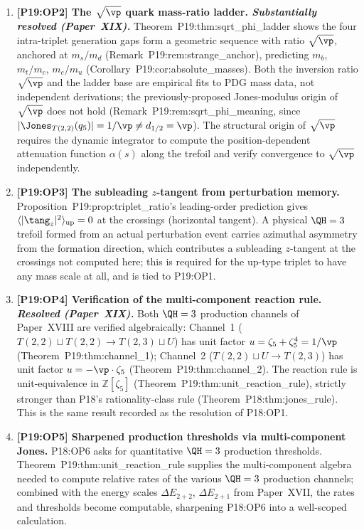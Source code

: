 \begin{enumerate}[label=,leftmargin=*]
\item \textbf{[P19:OP2] The $\sqrt\vp$ quark mass-ratio ladder. \emph{Substantially resolved (Paper~XIX).}}
Theorem~P19:thm:sqrt\_phi\_ladder shows the four intra-triplet
generation gaps form a geometric sequence with ratio $\sqrt\vp$,
anchored at $m_s/m_d$ (Remark~P19:rem:strange\_anchor), predicting
$m_b$, $m_t/m_c$, $m_c/m_u$ (Corollary~P19:cor:absolute\_masses). Both
the inversion ratio $\sqrt\vp$ and the ladder base are empirical fits
to PDG mass data, not independent derivations; the previously-proposed
Jones-modulus origin of $\sqrt\vp$ does not hold
(Remark~P19:rem:sqrt\_phi\_meaning, since
$|\Jones_{T(2,2)}(q_5)|=1/\vp\neq d_{1/2}=\vp$). The structural origin
of $\sqrt\vp$ requires the dynamic integrator to compute the
position-dependent attenuation function $\alpha(s)$ along the trefoil
and verify convergence to $\sqrt\vp$ independently.

\item \textbf{[P19:OP3] The subleading $z$-tangent from perturbation memory.}
Proposition~P19:prop:triplet\_ratio's leading-order prediction gives
$\langle|\tang_z|^2\rangle_{\mathrm{up}}=0$ at the crossings (horizontal
tangent). A physical $\QH=3$ trefoil formed from an actual perturbation
event carries azimuthal asymmetry from the formation direction, which
contributes a subleading $z$-tangent at the crossings not computed
here; this is required for the up-type triplet to have any mass scale
at all, and is tied to P19:OP1.

\item \textbf{[P19:OP4] Verification of the multi-component reaction rule. \emph{Resolved (Paper~XIX).}}
Both $\QH=3$ production channels of Paper~XVIII are verified
algebraically: Channel~1 ($T(2,2)\sqcup T(2,2)\to T(2,3)\sqcup U$) has
unit factor $u=\zeta_5+\zeta_5^4=1/\vp$ (Theorem~P19:thm:channel\_1); Channel~2
($T(2,2)\sqcup U\to T(2,3)$) has unit factor $u=-\vp\cdot\zeta_5$
(Theorem~P19:thm:channel\_2). The reaction rule is unit-equivalence in
$\mathbb{Z}[\zeta_5]$ (Theorem~P19:thm:unit\_reaction\_rule), strictly
stronger than P18's rationality-class rule (Theorem~P18:thm:jones\_rule).
This is the same result recorded as the resolution of P18:OP1.

\item \textbf{[P19:OP5] Sharpened production thresholds via multi-component Jones.}
P18:OP6 asks for quantitative $\QH=3$ production thresholds.
Theorem~P19:thm:unit\_reaction\_rule supplies the multi-component
algebra needed to compute relative rates of the various $\QH=3$
production channels; combined with the energy scales
$\Delta E_{2+2}$, $\Delta E_{2+1}$ from Paper~XVII, the rates and
thresholds become computable, sharpening P18:OP6 into a well-scoped
calculation.


\end{enumerate}

